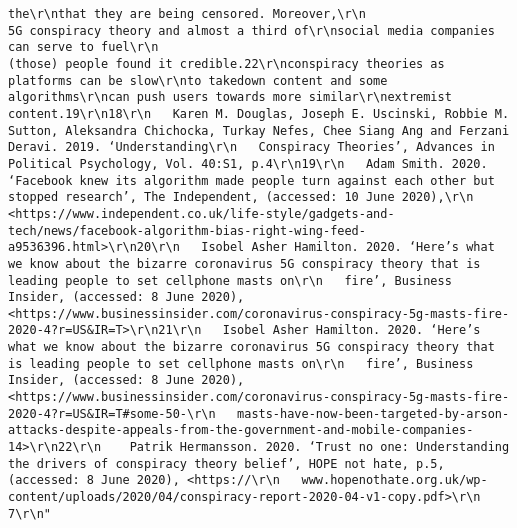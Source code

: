 \documentclass[
]{book}
\begin{document}
\begin{verbatim}
the\r\nthat they are being censored. Moreover,\r\n                                                                                    5G conspiracy theory and almost a third of\r\nsocial media companies can serve to fuel\r\n                                                                                    (those) people found it credible.22\r\nconspiracy theories as platforms can be slow\r\nto takedown content and some algorithms\r\ncan push users towards more similar\r\nextremist content.19\r\n18\r\n   Karen M. Douglas, Joseph E. Uscinski, Robbie M. Sutton, Aleksandra Chichocka, Turkay Nefes, Chee Siang Ang and Ferzani Deravi. 2019. ‘Understanding\r\n   Conspiracy Theories’, Advances in Political Psychology, Vol. 40:S1, p.4\r\n19\r\n   Adam Smith. 2020. ‘Facebook knew its algorithm made people turn against each other but stopped research’, The Independent, (accessed: 10 June 2020),\r\n   <https://www.independent.co.uk/life-style/gadgets-and-tech/news/facebook-algorithm-bias-right-wing-feed-a9536396.html>\r\n20\r\n   Isobel Asher Hamilton. 2020. ‘Here’s what we know about the bizarre coronavirus 5G conspiracy theory that is leading people to set cellphone masts on\r\n   fire’, Business Insider, (accessed: 8 June 2020), <https://www.businessinsider.com/coronavirus-conspiracy-5g-masts-fire-2020-4?r=US&IR=T>\r\n21\r\n   Isobel Asher Hamilton. 2020. ‘Here’s what we know about the bizarre coronavirus 5G conspiracy theory that is leading people to set cellphone masts on\r\n   fire’, Business Insider, (accessed: 8 June 2020), <https://www.businessinsider.com/coronavirus-conspiracy-5g-masts-fire-2020-4?r=US&IR=T#some-50-\r\n   masts-have-now-been-targeted-by-arson-attacks-despite-appeals-from-the-government-and-mobile-companies-14>\r\n22\r\n    Patrik Hermansson. 2020. ‘Trust no one: Understanding the drivers of conspiracy theory belief’, HOPE not hate, p.5, (accessed: 8 June 2020), <https://\r\n   www.hopenothate.org.uk/wp-content/uploads/2020/04/conspiracy-report-2020-04-v1-copy.pdf>\r\n                                                                              7\r\n"                                                                                                                                                                                                                                                                                                                                                                                                                                                                                                                                                                                                                 

\end{verbatim}
\end{document}
